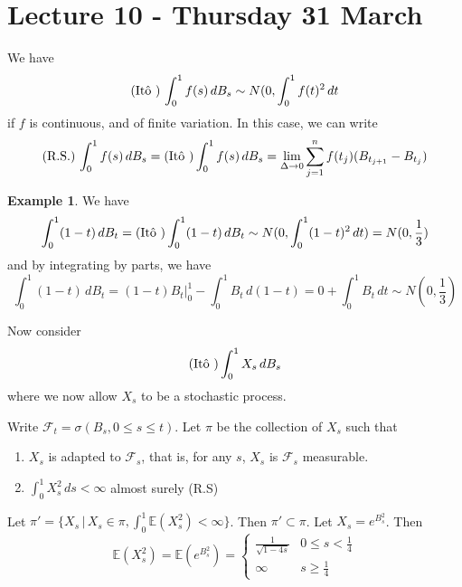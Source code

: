 \documentclass[10pt, oneside, reqno]{amsart}
\theoremstyle{plain}%
\theoremstyle{definition}
\newtheorem{exmp}[thm]{Example}
\theoremstyle{remark}
\newcommand{\E}{\mathbb{E}}
\newcommand{\sigf}{\mathcal{F}}
\begin{document}

\section{Lecture 10 - Thursday 31 March} %
\label{sec:lecture_10_thursday_31_march}
We have \[
	(\text{\text{It\^o\ }})\, \int_0^1 f(s) \, dB_s \sim N(0, \int_0^1 f(t)^2 \, dt
\] if $f$ is continuous, and of finite variation.  In this case, we can write \[
	(\text{R.S.}) \, \int_0^1 f(s) \, dB_s = (\text{\text{It\^o\ }}) \int_0^1 f(s) \, dB_s = \lim_{\Delta \rightarrow 0} \sum_{j=1}^n f(t_j) (B_{t_{j+1}} - B_{t_j})
\]

\begin{exmp}
	We have \[
		\int_0^1 (1-t) \, dB_t =  (\text{It\^o\ }) \int_0^1 (1-t) \, dB_t \sim N(0, \int_0^1 (1-t)^2 \, dt) = N(0, \frac{1}{3})
 	\] and by integrating by parts, we have \[
 		\int_0^1 (1-t) \, dB_t = (1-t) B_t |_0^1 - \int_0^1 B_t \, d(1-t) = 0 + \int_0^1 B_t \, dt \sim N(0, \frac{1}{3})
 	\]
\end{exmp}

Now consider \[
	(\text{It\^o\ }) \int_0^1 X_s \, dB_s
\] where we now allow $X_s$ to be a stochastic process.

Write $\sigf_t = \sigma(B_s, 0 \leq s \leq t).$  Let $\pi$ be the collection of $X_s$ such that 
\begin{enumerate}[(1)]
	\item $X_s$ is adapted to $\sigf_s$, that is, for any $s$, $X_s$ is $\sigf_s$ measurable.  
	\item $\int_0^1 X_s^2 \, ds < \infty$ almost surely (R.S)
\end{enumerate} 

Let $\pi' = \{ X_s \, | \, X_s \in \pi, \int_0^1 \E(X_s^2) < \infty \}$.  Then $\pi' \subset \pi$.  Let $X_s = e^{B_s^2}$.  Then \[
	\E(X_s^2) = \E(e^{B_s^2}) = \begin{cases}
		\frac{1}{\sqrt{1-4s}} & 0 \leq s < \frac{1}{4} \\
		\infty & s \geq \frac{1}{4}
	\end{cases}
\]  
\end{document}
